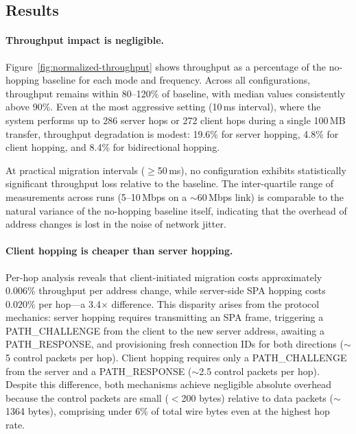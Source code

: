 \subsection{Results}

\paragraph{Throughput impact is negligible.}
Figure~\ref{fig:normalized-throughput} shows throughput as a percentage of the no-hopping baseline for each mode and frequency. Across all configurations, throughput remains within 80--120\% of baseline, with median values consistently above 90\%. Even at the most aggressive setting (10\,ms interval), where the system performs up to 286 server hops or 272 client hops during a single 100\,MB transfer, throughput degradation is modest: 19.6\% for server hopping, 4.8\% for client hopping, and 8.4\% for bidirectional hopping.

At practical migration intervals ($\geq$50\,ms), no configuration exhibits statistically significant throughput loss relative to the baseline. The inter-quartile range of measurements across runs (5--10\,Mbps on a $\sim$60\,Mbps link) is comparable to the natural variance of the no-hopping baseline itself, indicating that the overhead of address changes is lost in the noise of network jitter.

\paragraph{Client hopping is cheaper than server hopping.}
Per-hop analysis reveals that client-initiated migration costs approximately $0.006\%$ throughput per address change, while server-side SPA hopping costs $0.020\%$ per hop---a 3.4$\times$ difference. This disparity arises from the protocol mechanics: server hopping requires transmitting an SPA frame, triggering a PATH\_CHALLENGE from the client to the new server address, awaiting a PATH\_RESPONSE, and provisioning fresh connection IDs for both directions ($\sim$5 control packets per hop). Client hopping requires only a PATH\_CHALLENGE from the server and a PATH\_RESPONSE ($\sim$2.5 control packets per hop). Despite this difference, both mechanisms achieve negligible absolute overhead because the control packets are small ($<$200 bytes) relative to data packets ($\sim$1364 bytes), comprising under 6\% of total wire bytes even at the highest hop rate.

